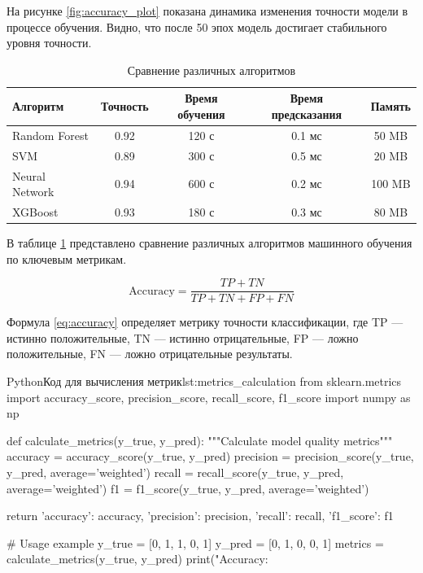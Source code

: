 На рисунке \ref{fig:accuracy_plot} показана динамика изменения точности модели в процессе обучения. Видно, что после 50 эпох модель достигает стабильного уровня точности.

\begin{table}[H]
\centering
\caption{Сравнение различных алгоритмов}
\label{tab:algorithm_comparison}
\begin{tabular}{|l|c|c|c|c|}
\hline
\textbf{Алгоритм} & \textbf{Точность} & \textbf{Время обучения} & \textbf{Время предсказания} & \textbf{Память} \\
\hline
Random Forest & 0.92 & 120 с & 0.1 мс & 50 MB \\
SVM & 0.89 & 300 с & 0.5 мс & 20 MB \\
Neural Network & 0.94 & 600 с & 0.2 мс & 100 MB \\
XGBoost & 0.93 & 180 с & 0.3 мс & 80 MB \\
\hline
\end{tabular}
\end{table}

В таблице \ref{tab:algorithm_comparison} представлено сравнение различных алгоритмов машинного обучения по ключевым метрикам.

\begin{equation}
\text{Accuracy} = \frac{TP + TN}{TP + TN + FP + FN}
\label{eq:accuracy}
\end{equation}

Формула \ref{eq:accuracy} определяет метрику точности классификации, где TP — истинно положительные, TN — истинно отрицательные, FP — ложно положительные, FN — ложно отрицательные результаты.

\begin{CodeBlock}{Python}{Код для вычисления метрик}{lst:metrics_calculation}
from sklearn.metrics import accuracy_score, precision_score, recall_score, f1_score
import numpy as np

def calculate_metrics(y_true, y_pred):
    """Calculate model quality metrics"""
    accuracy = accuracy_score(y_true, y_pred)
    precision = precision_score(y_true, y_pred, average='weighted')
    recall = recall_score(y_true, y_pred, average='weighted')
    f1 = f1_score(y_true, y_pred, average='weighted')
    
    return {
        'accuracy': accuracy,
        'precision': precision,
        'recall': recall,
        'f1_score': f1
    }

# Usage example
y_true = [0, 1, 1, 0, 1]
y_pred = [0, 1, 0, 0, 1]
metrics = calculate_metrics(y_true, y_pred)
print("Accuracy: %
\end{CodeBlock}

